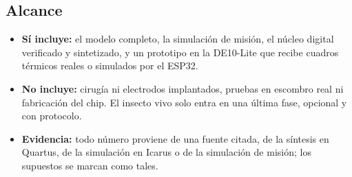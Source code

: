 \subsection{Alcance}

\begin{itemize}
  \item \textbf{Sí incluye:} el modelo completo, la simulación de misión, el núcleo digital
        verificado y sintetizado, y un prototipo en la DE10-Lite que recibe cuadros térmicos
        reales o simulados por el ESP32.
  \item \textbf{No incluye:} cirugía ni electrodos implantados, pruebas en escombro real ni
        fabricación del chip. El insecto vivo solo entra en una última fase, opcional y con protocolo.
  \item \textbf{Evidencia:} todo número proviene de una fuente citada, de la síntesis en Quartus,
        de la simulación en Icarus o de la simulación de misión; los supuestos se marcan como tales.
\end{itemize}
